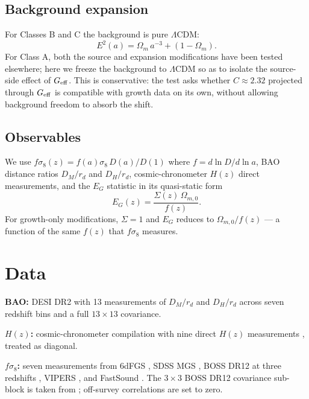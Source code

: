 \documentclass[11pt,a4paper]{article}
\begin{document}
\subsection{Background expansion}

For Classes B and C the background is pure $\Lambda$CDM:
\begin{equation}
    E^2(a) = \Omega_m\, a^{-3} + (1 - \Omega_m).
    \label{eq:lcdm_bg}
\end{equation}
For Class A, both the source and expansion modifications have been tested elsewhere; here we freeze the background to $\Lambda$CDM so as to isolate the source-side effect of $G_{\rm eff}$. This is conservative: the test asks whether $C \approx 2.32$ projected through $G_{\rm eff}$ is compatible with growth data on its own, without allowing background freedom to absorb the shift.

\subsection{Observables}

We use $f\sigma_8(z) = f(a)\sigma_8\, D(a)/D(1)$ where $f = d\ln D/d\ln a$, BAO distance ratios $D_M/r_d$ and $D_H/r_d$, cosmic-chronometer $H(z)$ direct measurements, and the $E_G$ statistic in its quasi-static form
\begin{equation}
    E_G(z) = \frac{\Sigma(z)\, \Omega_{m,0}}{f(z)}.
    \label{eq:Eg_def}
\end{equation}
For growth-only modifications, $\Sigma = 1$ and $E_G$ reduces to $\Omega_{m,0}/f(z)$ --- a function of the same $f(z)$ that $f\sigma_8$ measures.

\section{Data}

\textbf{BAO:} DESI DR2 \cite{DESI_DR2} with 13 measurements of $D_M/r_d$ and $D_H/r_d$ across seven redshift bins and a full $13 \times 13$ covariance.

\textbf{$H(z)$:} cosmic-chronometer compilation with nine direct $H(z)$ measurements \cite{Moresco2016}, treated as diagonal.

\textbf{$f\sigma_8$:} seven measurements from 6dFGS \cite{Beutler2012}, SDSS MGS \cite{Howlett2015}, BOSS DR12 at three redshifts \cite{Alam2017}, VIPERS \cite{Pezzotta2017}, and FastSound \cite{Okumura2016}. The $3\times 3$ BOSS DR12 covariance sub-block is taken from \cite{GilMarin2020}; off-survey correlations are set to zero.
\end{document}
